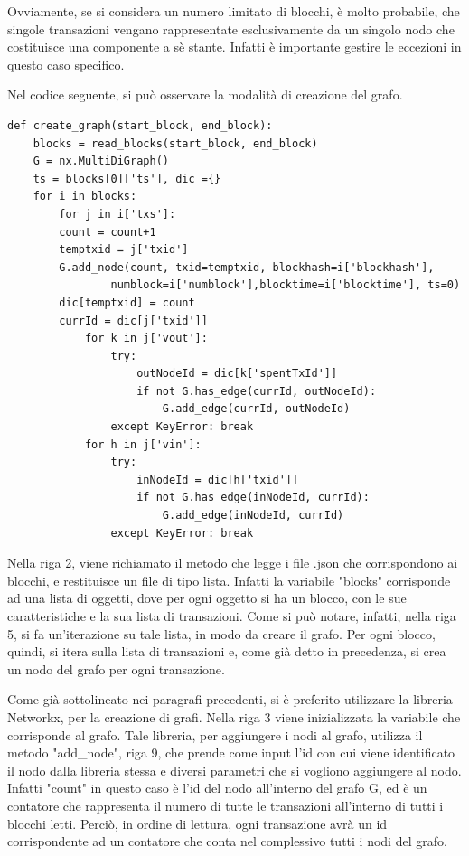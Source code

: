 Ovviamente, se si considera un numero limitato di blocchi, è molto probabile, che singole transazioni vengano rappresentate esclusivamente da un singolo nodo che costituisce una componente a sè stante. Infatti è importante gestire le eccezioni in questo caso specifico.

Nel codice seguente, si può osservare la modalità di creazione del grafo.


\begin{lstlisting}[basicstyle=\tiny]
def create_graph(start_block, end_block):
	blocks = read_blocks(start_block, end_block)	
	G = nx.MultiDiGraph()
	ts = blocks[0]['ts'], dic ={}
	for i in blocks:
		for j in i['txs']:
		count = count+1
		temptxid = j['txid']
		G.add_node(count, txid=temptxid, blockhash=i['blockhash'], 
				numblock=i['numblock'],blocktime=i['blocktime'], ts=0)
		dic[temptxid] = count
		currId = dic[j['txid']]
			for k in j['vout']:
				try:
					outNodeId = dic[k['spentTxId']]	
					if not G.has_edge(currId, outNodeId):
						G.add_edge(currId, outNodeId)
				except KeyError: break	
			for h in j['vin']:
				try:
					inNodeId = dic[h['txid']]
					if not G.has_edge(inNodeId, currId):
						G.add_edge(inNodeId, currId)
				except KeyError: break	
\end{lstlisting}
\newpage
Nella riga 2, viene richiamato il metodo che legge i file .json che corrispondono ai blocchi, e restituisce un file di tipo lista. Infatti la variabile "blocks" corrisponde ad una lista di oggetti, dove per ogni oggetto si ha un blocco, con le sue caratteristiche e la sua lista di transazioni. Come si può notare, infatti, nella riga 5, si fa un'iterazione su tale lista, in modo da creare il grafo. Per ogni blocco, quindi, si itera sulla lista di transazioni e, come già detto in precedenza, si crea un nodo del grafo per ogni transazione. 

Come già sottolineato nei paragrafi precedenti, si è preferito utilizzare la libreria Networkx, per la creazione di grafi. Nella riga 3 viene inizializzata la variabile che corrisponde al grafo. Tale libreria, per aggiungere i nodi al grafo, utilizza il metodo "add_node", riga 9, che prende come input l'id con cui viene identificato il nodo dalla libreria stessa e diversi parametri che si vogliono aggiungere al nodo. Infatti "count" in questo caso è l'id del nodo all'interno del grafo G, ed è un contatore che rappresenta il numero di tutte le transazioni all'interno di tutti i blocchi letti. Perciò, in ordine di lettura, ogni transazione avrà un id corrispondente ad un contatore che conta nel complessivo tutti i nodi del grafo.

